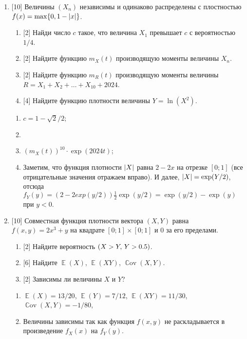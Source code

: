 \documentclass[12pt]{article}
\DeclareMathOperator{\Cov}{\mathbb{C}ov}
\let\P\relax
\DeclareMathOperator{\P}{\mathbb{P}}
\DeclareMathOperator{\E}{\mathbb{E}}
\DeclarePairedDelimiter{\abs}{\lvert}{\rvert}
\begin{document}
\begin{enumerate}
    \item {[10]} Величины $(X_n)$ независимы и одинаково распределены с плостностью $f(x) = \max\{0, 1 - \abs{x}\}$.
    \begin{enumerate}
        \item {[2]} Найди число $c$ такое, что величина $X_1$ превышает $c$ с вероятностью $1/4$.
        \item {[2]} Найдите функцию $m_X(t)$ производящую моменты величины $X_n$.
        \item {[2]} Найдите функцию $m_R(t)$ производящую моменты величины $R = X_1 + X_2 + \dots + X_{10} + 2024$.
        \item {[4]} Найдите функцию плотности величины $Y = \ln (X^2)$.
    \end{enumerate}

    \begin{enumerate}
        \item $c = 1 - \sqrt{2}/2$;
        \item 
        \item $(m_X(t))^{10}\cdot \exp(2024t)$;
        \item Заметим, что функция плотности $\abs{X}$ равна $2 - 2x$ на отрезке $[0;1]$ (все отрицательные значения отражаем вправо).
        И далее, $\abs{X} = \exp(Y/2)$, отсюда $f_Y(y) = (2 - 2exp(y/2)) \frac{1}{2}\exp(y/2) = \exp(y/2) - \exp(y)$ при $y<0$.
    \end{enumerate}

    \item {[10]} Совместная функция плотности вектора $(X, Y)$ равна $f(x, y) = 2x^3 + y$ на квадрате $[0;1] \times [0;1]$ и $0$ за его пределами. 
    \begin{enumerate}
        \item {[2]} Найдите вероятность $\P(X > Y,\, Y > 0.5)$. 
        \item {[6]} Найдите $\E(X)$, $\E(XY)$, $\Cov(X, Y)$.
        \item {[2]} Зависимы ли величины $X$ и $Y$?
    \end{enumerate}
    
    \begin{enumerate}
        \item $\E(X) = 13/20$, $\E(Y) = 7/12$, $\E(XY) = 11/30$, $\Cov(X, Y) = -1 / 80$,
        \item Величины зависимы так как функция $f(x, y)$ не раскладывается в произведение $f_X(x)$ на $f_Y(y)$.
    \end{enumerate}
   



\end{enumerate}
\end{document}
